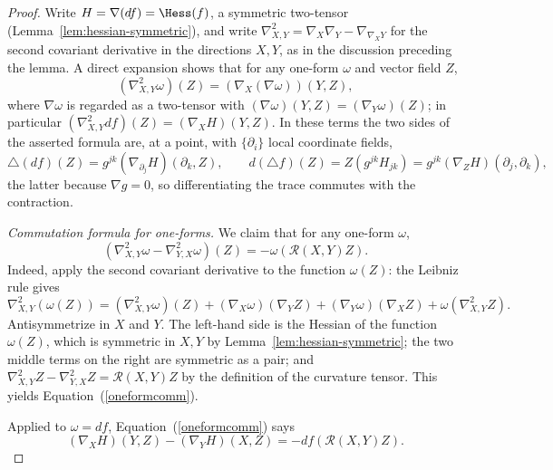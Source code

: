 \begin{proof}
\leanok
Write $H=\nabla(df)=\Hess(f)$, a symmetric two-tensor
(Lemma~\ref{lem:hessian-symmetric}), and write
$\nabla^2_{X,Y}=\nabla_X\nabla_Y-\nabla_{\nabla_XY}$ for the second
covariant derivative in the directions $X,Y$, as in the discussion
preceding the lemma. A direct expansion shows that for any one-form
$\omega$ and vector field $Z$,
$$\left(\nabla^2_{X,Y}\omega\right)(Z)=(\nabla_X(\nabla\omega))(Y,Z),$$
where $\nabla\omega$ is regarded as a two-tensor with
$(\nabla\omega)(Y,Z)=(\nabla_Y\omega)(Z)$; in particular
$\left(\nabla^2_{X,Y}df\right)(Z)=(\nabla_XH)(Y,Z)$. In these terms
the two sides of the asserted formula are, at a point, with
$\{\partial_i\}$ local coordinate fields,
$$\triangle(df)(Z)=g^{jk}\left(\nabla_{\partial_j}H\right)(\partial_k,Z),
\qquad
d(\triangle f)(Z)=Z\left(g^{jk}H_{jk}\right)
=g^{jk}\left(\nabla_ZH\right)(\partial_j,\partial_k),$$
the latter because $\nabla g=0$, so differentiating the trace
commutes with the contraction.

\emph{Commutation formula for one-forms.} We claim that for any
one-form $\omega$,
\begin{equation}\label{oneformcomm}
\left(\nabla^2_{X,Y}\omega-\nabla^2_{Y,X}\omega\right)(Z)
=-\omega\left({\mathcal R}(X,Y)Z\right).
\end{equation}
Indeed, apply the second covariant derivative to the function
$\omega(Z)$: the Leibniz rule gives
$$\nabla^2_{X,Y}\left(\omega(Z)\right)
=\left(\nabla^2_{X,Y}\omega\right)(Z)
+(\nabla_X\omega)(\nabla_YZ)+(\nabla_Y\omega)(\nabla_XZ)
+\omega\left(\nabla^2_{X,Y}Z\right).$$
Antisymmetrize in $X$ and $Y$. The left-hand side is the Hessian of
the function $\omega(Z)$, which is symmetric in $X,Y$ by
Lemma~\ref{lem:hessian-symmetric}; the two middle terms on the right
are symmetric as a pair; and
$\nabla^2_{X,Y}Z-\nabla^2_{Y,X}Z={\mathcal R}(X,Y)Z$ by the
definition of the curvature tensor. This yields
Equation~(\ref{oneformcomm}).

Applied to $\omega=df$, Equation~(\ref{oneformcomm}) says
\begin{equation}\label{Hcomm}
(\nabla_XH)(Y,Z)-(\nabla_YH)(X,Z)=-df\left({\mathcal
R}(X,Y)Z\right).
\end{equation}


\end{proof}
